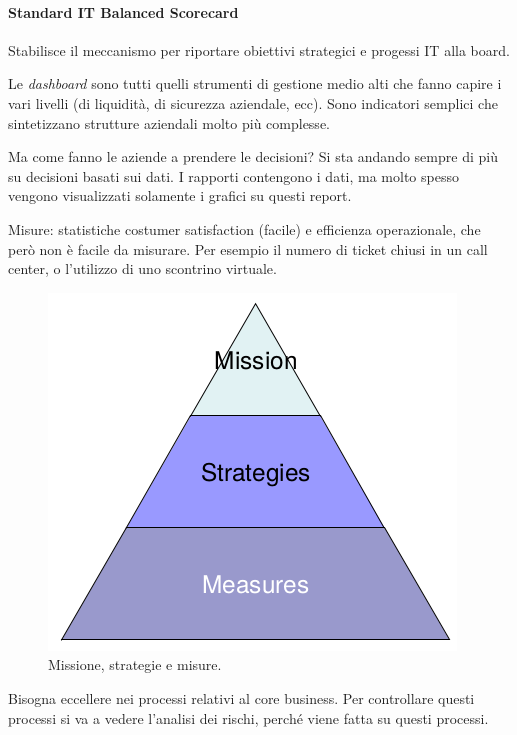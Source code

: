 \paragraph*{Standard IT Balanced Scorecard}

Stabilisce il meccanismo per riportare obiettivi strategici e progessi IT alla
board.	

Le \textit{dashboard} sono tutti quelli strumenti di gestione medio alti che 
fanno capire i vari livelli (di liquidità, di sicurezza aziendale, ecc). Sono 
indicatori semplici che sintetizzano strutture aziendali molto più complesse.

Ma come fanno le aziende a prendere le decisioni? Si sta andando sempre di più 
su decisioni basati sui dati. I rapporti contengono i dati, ma molto spesso 
vengono visualizzati solamente i grafici su questi report.

Misure: statistiche costumer satisfaction (facile) e efficienza operazionale, 
che però non è facile da misurare. Per esempio il numero di ticket chiusi in un 
call center, o l'utilizzo di uno scontrino virtuale.

\begin{figure}[h!]
        \begin{center}
                \includegraphics[scale=0.5]{res/img/measures}
        \end{center}
        \caption{Missione, strategie e misure.}
\end{figure}

Bisogna eccellere nei processi relativi al core business. Per controllare questi  
processi si va a vedere l'analisi dei rischi, perché viene fatta su questi processi.

